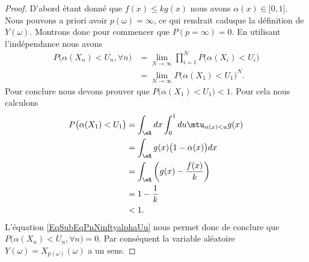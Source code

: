 \begin{proof}
    D'abord étant donné que \( f(x)\leq kg(x)\) nous avons \( \alpha(x)\in\mathopen[ 0 , 1 \mathclose]\). Nous pouvons a priori avoir \( p(\omega)=\infty\), ce qui rendrait caduque la définition de \( Y(\omega)\). Montrons donc pour commencer que \( P(p=\infty)=0\). En utilisant l'indépendance nous avons
    \begin{subequations}        \label{EqSubEqPnNinftyalphaUu}
        \begin{align}
            P\big( \alpha(X_n)<U_n,\forall n\big)&=\lim_{N\to \infty} \prod_{i=1}^NP\big( \alpha(X_i)< U_i \big)\\
            &=\lim_{N\to \infty} P\big( \alpha(X_1)<U_1 \big)^N.
        \end{align}
    \end{subequations}
    Pour conclure nous devons prouver que \( P\big( \alpha(X_1)<U_1 \big)< 1\). Pour cela nous calculons
    \begin{subequations}
        \begin{align}
            P\big( \alpha(X_1)<U_1 \big)&=\int_{\eR}dx\int_0^1du\mtu_{\alpha(x)<u}g(x)\\
            &=\int_{\eR}g(x)\big( 1-\alpha(x) \big)dx\\
            &=\int_{\eR}\left( g(x)-\frac{ f(x) }{ k } \right)\\
            &=1-\frac{1}{ k }\\
            &<1.
        \end{align}
    \end{subequations}
    L'équation \eqref{EqSubEqPnNinftyalphaUu} nous permet donc de conclure que \( P\big( \alpha(X_n)<U_n,\forall n\big)=0\). Par conséquent la variable aléatoire \( Y(\omega)=X_{p(\omega)}(\omega)\) a un sens.


\end{proof}
